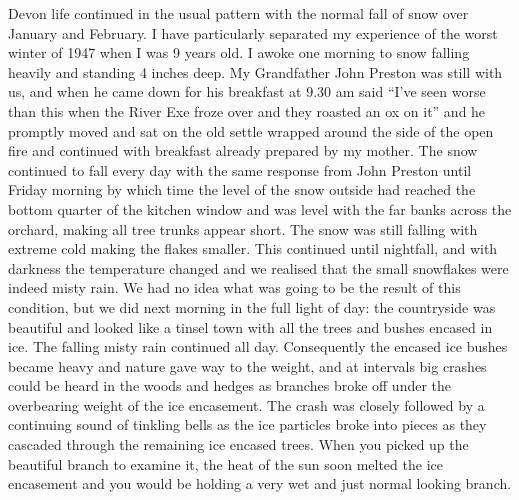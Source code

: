 
Devon life continued in the usual pattern with the normal fall of snow over
January and February. I have particularly separated my experience of the worst
winter of 1947 when I was 9 years old. I awoke one morning to snow falling
heavily and standing 4 inches deep. My Grandfather John Preston was still with
us, and when he came down for his breakfast at 9.30 am said ``I've seen worse
than this when the River Exe froze over and they roasted an ox on it'' and he
promptly moved and sat on the old settle wrapped around the side of the open
fire and continued with breakfast already prepared by my mother. The snow
continued to fall every day with the same response from John Preston until
Friday morning by which time the level of the snow outside had reached the
bottom quarter of the kitchen window and was level with the far banks across
the orchard, making all tree trunks appear short. The snow was still falling
with extreme cold making the flakes smaller. This continued until nightfall,
and with darkness the temperature changed and we realised that the small
snowflakes were indeed misty rain. We had no idea what was going to be the
result of this condition, but we did next morning in the full light of day: the
countryside was beautiful and looked like a tinsel town with all the trees and
bushes encased in ice. The falling misty rain continued all day. Consequently
the encased ice bushes became heavy and nature gave way to the weight, and at
intervals big crashes could be heard in the woods and hedges as branches broke
off under the overbearing weight of the ice encasement. The crash was closely
followed by a continuing sound of tinkling bells as the ice particles broke
into pieces as they cascaded through the remaining ice encased trees. When you
picked up the beautiful branch to examine it, the heat of the sun soon melted
the ice encasement and you would be holding a very wet and just normal looking
branch.

